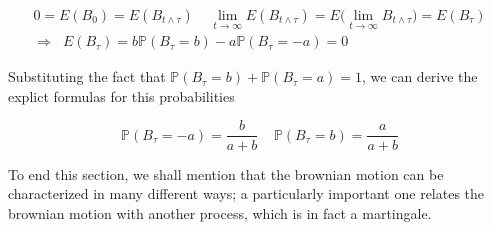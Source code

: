 \begin{gather*}
    0 = E(B_0) = E(B_{t \wedge \tau}) \;\;\;\; \lim_{t \to \infty} E(B_{t \wedge \tau}) = E\Big( \lim_{t \to \infty} B_{t \wedge \tau} \Big) = E(B_{\tau}) \\
    \Rightarrow \;\; E(B_{\tau}) = b \mathbb{P}(B_{\tau} = b) - a \mathbb{P}(B_{\tau} = -a) = 0
\end{gather*}

Substituting the fact that $\mathbb{P}(B_{\tau} = b) + \mathbb{P}(B_{\tau}=a) = 1$, we can derive the explict formulas for this probabilities 

\begin{equation*}
    \mathbb{P}(B_{\tau} = -a) = \frac{b}{a+b} \;\;\;\; \mathbb{P}(B_{\tau} = b) = \frac{a}{a+b}
\end{equation*}

To end this section, we shall mention that the brownian motion can be characterized in many different ways; a particularly important one relates the brownian motion with another process, which is in fact a martingale. 

